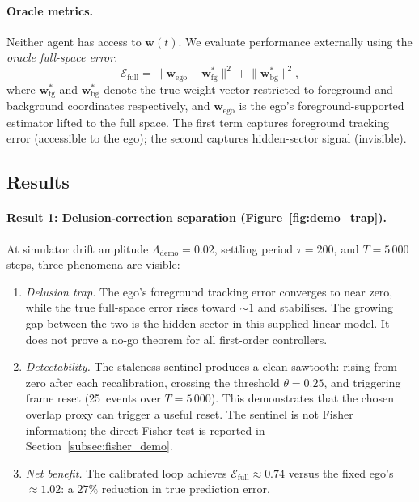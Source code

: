 \documentclass[12pt]{article}
\begin{document}
\paragraph{Oracle metrics.}
Neither agent has access to $\mathbf{w}(t)$.
We evaluate performance externally using the \emph{oracle
full-space error}:
\begin{equation}
\label{eq:oracle_error}
\mathcal{E}_{\mathrm{full}}
= \bigl\|\mathbf{w}_{\mathrm{ego}}
  - \mathbf{w}^*_{\mathrm{fg}}\bigr\|^2
+ \bigl\|\mathbf{w}^*_{\mathrm{bg}}\bigr\|^2,
\end{equation}
where $\mathbf{w}^*_{\mathrm{fg}}$ and
$\mathbf{w}^*_{\mathrm{bg}}$ denote the true weight vector
restricted to foreground and background coordinates
respectively, and $\mathbf{w}_{\mathrm{ego}}$ is the ego's
foreground-supported estimator lifted to the full space.
The first term captures foreground tracking error (accessible
to the ego); the second captures hidden-sector signal
(invisible).

\subsection{Results}
\label{subsec:demo_results}

\paragraph{Result 1: Delusion-correction separation
(Figure~\ref{fig:demo_trap}).}
At simulator drift amplitude $\Lambda_{\mathrm{demo}} = 0.02$,
settling period $\tau = 200$,
and $T = 5\,000$ steps, three phenomena are visible:

\begin{enumerate}
\item[(a)]
\emph{Delusion trap.}
The ego's foreground tracking error converges
to near zero, while the true full-space error rises
toward $\sim\!1$ and stabilises.
The growing gap between the two is the hidden sector in this supplied
linear model.  It does not prove a no-go theorem for all first-order
controllers.

\item[(b)]
\emph{Detectability.}
The staleness sentinel produces a clean sawtooth:
rising from zero after each recalibration, crossing the
threshold $\theta = 0.25$, and triggering frame reset
(25~events over $T = 5\,000$).
This demonstrates that the chosen overlap proxy can trigger a useful
reset.  The sentinel is not Fisher information; the direct Fisher test
is reported in Section~\ref{subsec:fisher_demo}.

\item[(c)]
\emph{Net benefit.}
The calibrated loop achieves
$\mathcal{E}_{\mathrm{full}} \approx 0.74$
versus the fixed ego's $\approx 1.02$:
a $27\%$ reduction in true prediction error.
\end{enumerate}
\end{document}
